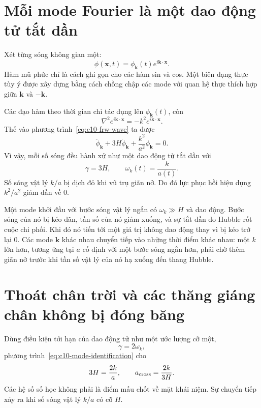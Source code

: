 \section{Mỗi mode Fourier là một dao động tử tắt dần}

Xét từng sóng không gian một:
\begin{equation}
\phi(\mathbf x,t)
=\phi_{\mathbf k}(t)e^{i\mathbf k\cdot\mathbf x}.
\label{eq:c10-mode-ansatz}
\end{equation}
Hàm mũ phức chỉ là cách ghi gọn cho các hàm sin và cos. Một biên dạng thực tùy ý được xây dựng bằng cách chồng chập các mode với quan hệ thực thích hợp giữa \(\mathbf k\) và \(-\mathbf k\).

Các đạo hàm theo thời gian chỉ tác dụng lên \(\phi_{\mathbf k}(t)\), còn
\[
\nabla^2e^{i\mathbf k\cdot\mathbf x}
=-k^2e^{i\mathbf k\cdot\mathbf x}.
\]
Thế vào phương trình~\eqref{eq:c10-frw-wave} ta được
\begin{equation}
\ddot\phi_{\mathbf k}
+3H\dot\phi_{\mathbf k}
+\frac{k^2}{a^2}\phi_{\mathbf k}=0.
\label{eq:c10-mode-equation}
\end{equation}
Vì vậy, mỗi số sóng đều hành xử như một dao động tử tắt dần với
\begin{equation}
\gamma=3H,
\qquad
\omega_k(t)=\frac{k}{a(t)}.
\label{eq:c10-mode-identification}
\end{equation}
Số sóng vật lý \(k/a\) bị dịch đỏ khi vũ trụ giãn nở. Do đó lực phục hồi hiệu dụng \(k^2/a^2\) giảm dần về 0.

Một mode khởi đầu với bước sóng vật lý ngắn có \(\omega_k\gg H\) và dao động. Bước sóng của nó bị kéo dãn, tần số của nó giảm xuống, và sự tắt dần do Hubble rốt cuộc chi phối. Khi đó nó tiến tới một giá trị không dao động thay vì bị kéo trở lại 0. Các mode \(\mathbf k\) khác nhau chuyển tiếp vào những thời điểm khác nhau: một \(k\) lớn hơn, tương ứng tại \(a\) cố định với một bước sóng ngắn hơn, phải chờ thêm giãn nở trước khi tần số vật lý của nó hạ xuống đến thang Hubble.

\section{Thoát chân trời và các thăng giáng chân không bị đóng băng}

Dùng điều kiện tới hạn của dao động tử như một ước lượng cỡ một,
\[
\gamma=2\omega_k,
\]
phương trình~\eqref{eq:c10-mode-identification} cho
\begin{equation}
3H=\frac{2k}{a},
\qquad
a_{\rm cross}=\frac{2k}{3H}.
\label{eq:c10-critical-mode}
\end{equation}
Các hệ số số học không phải là điểm mấu chốt về mặt khái niệm. Sự chuyển tiếp xảy ra khi số sóng vật lý \(k/a\) có cỡ \(H\).


